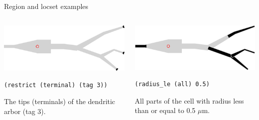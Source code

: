 \documentclass[aspectratio=43]{beamer}
\begin{document}
\begin{frame}[fragile]{Region and locset examples}
    \begin{columns}[T]
        \begin{column}{0.5\textwidth}
            \includegraphics[width=\textwidth]{images/ls_term.png}

            \vspace{10pt}

            \begin{lstlisting}[style=arblang]
(restrict (terminal) (tag 3))
            \end{lstlisting}

            The tips (terminals) of the dendritic arbor (tag 3).

        \end{column}
        \begin{column}{0.5\textwidth}
            \includegraphics[width=\textwidth]{images/reg_radle5.png}

            \vspace{10pt}

            \begin{lstlisting}[style=arblang]
(radius_le (all) 0.5)
            \end{lstlisting}
            All parts of the cell with radius less than or equal to 0.5 $\mu$m.

        \end{column}
    \end{columns}
\end{frame}
\end{document}
